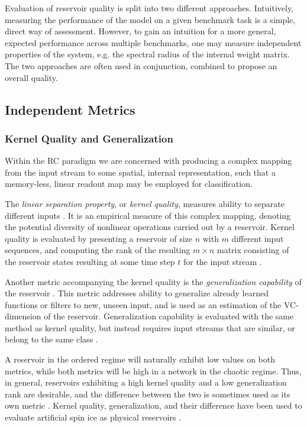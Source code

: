 Evaluation of reservoir quality is split into two different
approaches. Intuitively, measuring the performance of the model on a given
benchmark task is a simple, direct way of assessment. However, to gain an
intuition for a more general, expected performance across multiple benchmarks,
one may measure independent properties of the system, e.g. the spectral radius
of the internal weight matrix. The two approaches are often used in conjunction,
combined to propose an overall quality.

\subsection{Independent Metrics}
\label{ssec:metrics}

\subsubsection{Kernel Quality and Generalization}

Within the RC paradigm we are concerned with producing a complex mapping from
the input stream to some spatial, internal representation, such that a
memory-less, linear readout map may be employed for classification.

The \textit{linear separation property}, or \textit{kernel quality}, measures
ability to separate different inputs \cite{legenstein_edge_2007}. It is an
empirical measure of this complex mapping, denoting the potential diversity of
nonlinear operations carried out by a reservoir. Kernel quality is evaluated by
presenting a reservoir of size $n$ with $m$ different input sequences, and
computing the rank of the resulting $m\times n$ matrix consisting of the
reservoir states resulting at some time step $t$ for the input stream
\cite{busing_connectivity_2010}.

Another metric accompanying the kernel quality is the \textit{generalization
capability} of the reservoir \cite{legenstein_edge_2007}. This metric addresses
ability to generalize already learned functions or filters to new, unseen input,
and is used as an estimation of the VC-dimension of the
reservoir. Generalization capability is evaluated with the same method as kernel
quality, but instead requires input streams that are similar, or belong to the
same class \cite{busing_connectivity_2010}.

A reservoir in the ordered regime will naturally exhibit low values on both
metrics, while both metrics will be high in a network in the chaotic
regime. Thus, in general, reservoirs exhibiting a high kernel quality and a low
generalization rank are desirable, and the difference between the two is
sometimes used as its own metric \cite{busing_connectivity_2010}. Kernel
quality, generalization, and their difference have been used to evaluate
artificial spin ice as physical reservoirs \cite{jensen_reservoir_2020}.

